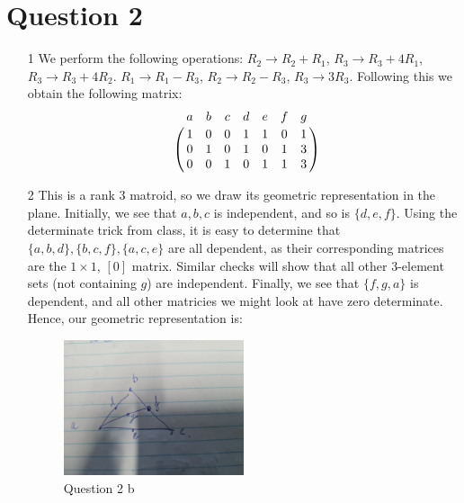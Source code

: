 \documentclass{article}
\begin{document}
\section*{Question 2}
\begin{enumerate}
    \item[1] We perform the following operations: $R_2\to R_2+R_1$, $R_3\to R_3+4R_1$, $R_3\to R_3+4R_2$.
        $R_1\to R_1-R_3$, $R_2\to R_2-R_3$, $R_3\to 3R_3$.
        Following this we obtain the following matrix:
        \[
            \bordermatrix{
                & a & b & c & d & e & f & g \cr
                & 1 & 0 & 0 & 1 & 1 & 0 & 1 \cr
                & 0 & 1 & 0 & 1 & 0 & 1 & 3 \cr
                & 0 & 0 & 1 & 0 & 1 & 1 & 3 
            }
        \]
    \item[2] This is a rank 3 matroid, so we draw its geometric representation in the plane.
        Initially, we see that $a, b, c$ is independent, and so is $\{d, e, f\}$. Using the determinate 
        trick from class, it is easy to determine that $\{a, b, d\}, \{b, c, f\}, \{a, c, e\}$ are all dependent,
        as their corresponding matrices are the $1\times 1$, $[0]$ matrix. Similar checks will show that all other 3-element sets (not containing $g$)
        are independent. Finally, we see that $\{f, g, a\}$ is dependent, and all other matricies we might look at have zero determinate. 
        Hence, our geometric representation is:
        \begin{figure}[!htb]
            \centering
            \includegraphics[width=0.5\textwidth]{q2b.jpg}
            \caption{Question 2 b}
        \end{figure}



\end{enumerate}
\end{document}
